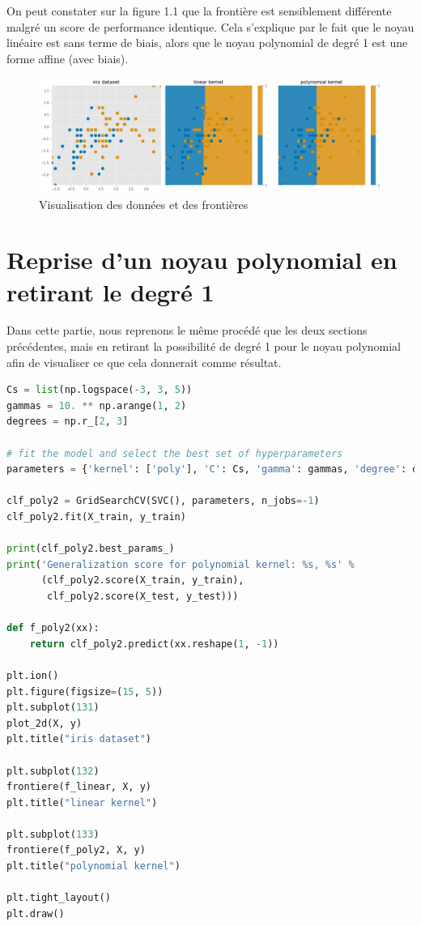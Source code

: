 \documentclass{book}
\begin{document}
On peut constater sur la figure 1.1 que la frontière est sensiblement différente malgré un score de performance identique. Cela s'explique par le fait que le noyau linéaire est sans terme de biais, alors que le noyau polynomial de degré 1 est une forme affine (avec biais). 

\begin{figure}[H] %
    \centering
    \includegraphics[width=1\textwidth]{figure 1.png}
    \caption{Visualisation des données et des frontières}
    \label{fig:exemple}
\end{figure}

\section{Reprise d'un noyau polynomial en retirant le degré 1}

Dans cette partie, nous reprenons le même procédé que les deux sections précédentes, mais en retirant la possibilité de degré 1 pour le noyau polynomial afin de visualiser ce que cela donnerait comme résultat.

\begin{lstlisting}[language=Python, caption=Programme de classification et de visualisation avec un noyau polynomial de degré supérieur à 1]
Cs = list(np.logspace(-3, 3, 5))
gammas = 10. ** np.arange(1, 2)
degrees = np.r_[2, 3]

# fit the model and select the best set of hyperparameters
parameters = {'kernel': ['poly'], 'C': Cs, 'gamma': gammas, 'degree': degrees}

clf_poly2 = GridSearchCV(SVC(), parameters, n_jobs=-1)
clf_poly2.fit(X_train, y_train)

print(clf_poly2.best_params_)
print('Generalization score for polynomial kernel: %s, %s' %
      (clf_poly2.score(X_train, y_train),
       clf_poly2.score(X_test, y_test)))

def f_poly2(xx):
    return clf_poly2.predict(xx.reshape(1, -1))

plt.ion()
plt.figure(figsize=(15, 5))
plt.subplot(131)
plot_2d(X, y)
plt.title("iris dataset")

plt.subplot(132)
frontiere(f_linear, X, y)
plt.title("linear kernel")

plt.subplot(133)
frontiere(f_poly2, X, y)
plt.title("polynomial kernel")

plt.tight_layout()
plt.draw()
\end{lstlisting}
\end{document}
